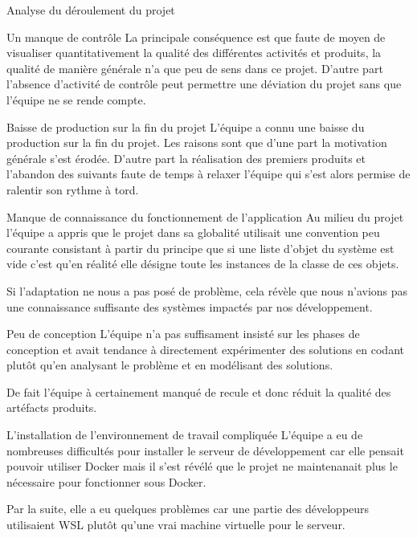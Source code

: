 \documentclass[]{article}
\begin{document}
{\begin{section}{Analyse du déroulement du projet}
\begin{subsection}{Un manque de contrôle}
     La principale conséquence est que faute de moyen de visualiser quantitativement la qualité des différentes activités et produits, la qualité de manière générale n'a que peu de sens dans ce projet. D'autre part l'absence d'activité de contrôle peut permettre une déviation du projet sans que l'équipe ne se rende compte.
 \end{subsection}

 \begin{subsection}{Baisse de production sur la fin du projet}
     L'équipe a connu une baisse du production sur la fin du projet. Les raisons sont que d'une part la motivation générale s'est érodée. D'autre part la réalisation des premiers produits et l'abandon des suivants faute de temps à relaxer l'équipe qui s'est alors permise de ralentir son rythme à tord.
 \end{subsection}

 \begin{subsection}{Manque de connaissance du fonctionnement de l'application}
     Au milieu du projet l'équipe a appris que le projet dans sa globalité utilisait une convention peu courante consistant à partir du principe que si une liste d'objet du système est vide c'est qu'en réalité elle désigne toute les instances de la classe de ces objets.

     Si l'adaptation ne nous a pas posé de problème, cela révèle que nous n'avions pas une connaissance suffisante des systèmes impactés par nos développement.
 \end{subsection}

 \begin{subsection}{Peu de conception}
     L'équipe n'a pas suffisament insisté sur les phases de conception et avait tendance à directement expérimenter des solutions en codant plutôt qu'en analysant le problème et en modélisant des solutions.

     De fait l'équipe à certainement manqué de recule et donc réduit la qualité des artéfacts produits.
 \end{subsection}

 \begin{subsection}{L'installation de l'environnement de travail compliquée}
     L'équipe a eu de nombreuses difficultés pour installer le serveur de développement car elle pensait pouvoir utiliser Docker mais il s'est révélé que le projet ne maintenanait plus le nécessaire pour fonctionner sous Docker.

     Par la suite, elle a eu quelques problèmes car une partie des développeurs utilisaient WSL plutôt qu'une vrai machine virtuelle pour le serveur.


\end{subsection}
\end{section}}
\end{document}
